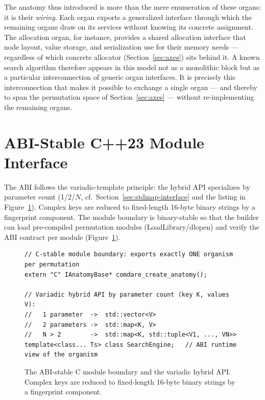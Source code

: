 The anatomy thus introduced is more than the mere enumeration of these organs: it is their
\emph{wiring}. Each organ exports a generalized interface through which the remaining organs draw on
its services without knowing its concrete assignment. The allocation organ, for instance, provides a
shared allocation interface that node layout, value storage, and serialization use for their memory
needs --- regardless of which concrete allocator (Section~\ref{sec:axes}) sits behind it. A known
search algorithm therefore appears in this model not as a monolithic block but as a particular
interconnection of generic organ interfaces. It is precisely this interconnection that makes it
possible to exchange a single organ --- and thereby to span the permutation space of
Section~\ref{sec:axes} --- without re-implementing the remaining organs.

\section{ABI-Stable C++23 Module Interface}\label{sec:abi}

The ABI follows the variadic-template principle: the hybrid API specializes by parameter count
(1/2/$N$, cf.\ Section~\ref{sec:stdmap-interface} and the listing in Figure~\ref{fig:abi}). Complex
keys are reduced to fixed-length
16-byte binary strings by a fingerprint component. The module boundary is binary-stable so that
the builder can load pre-compiled permutation modules (LoadLibrary/dlopen) and verify the ABI
contract per module (Figure~\ref{fig:abi}).

\begin{figure}[!htbp]
\begin{lstlisting}[basicstyle=\footnotesize\ttfamily,frame=single,xleftmargin=1.5em]
// C-stable module boundary: exports exactly ONE organism per permutation
extern "C" IAnatomyBase* comdare_create_anatomy();

// Variadic hybrid API by parameter count (key K, values V):
//   1 parameter  ->  std::vector<V>
//   2 parameters ->  std::map<K, V>
//   N > 2        ->  std::map<K, std::tuple<V1, ..., VN>>
template<class... Ts> class SearchEngine;   // ABI runtime view of the organism
\end{lstlisting}
  \caption{The ABI-stable C module boundary and the variadic hybrid API\@. Complex keys are reduced to
  fixed-length 16-byte binary strings by a fingerprint component.}\label{fig:abi}
\end{figure}

